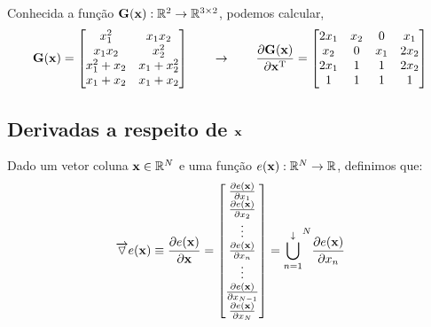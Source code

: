 \begin{example}
Conhecida a função $\MATRIX{G}(\VECTOR{x}): \mathbb{R}^2 \rightarrow \mathbb{R}^{3 \times 2}$, podemos calcular,
\begin{equation}
\MATRIX{G}(\VECTOR{x})=
\begin{bmatrix}
x_1^2       & x_1 x_2\\
x_1 x_2     & x_2^2\\
x_1^2 + x_2 & x_1 + x_2^2\\
x_1 + x_2   & x_1 + x_2
\end{bmatrix}
\qquad \rightarrow \qquad
\frac{\partial \MATRIX{G}(\VECTOR{x}) }{\partial \VECTOR{x}^{\transpose}}= 
\begin{bmatrix}
2 x_1 & x_2 & 0   &   x_1\\
  x_2 & 0   & x_1 & 2 x_2\\
2 x_1 & 1   & 1   & 2 x_2\\
    1 & 1   & 1   & 1
\end{bmatrix}
\end{equation}
\end{example}
\subsection{Derivadas a respeito de $\VECTOR{x}$}

\begin{definition}\label{def:deltaver}
Dado 
um vetor coluna $\VECTOR{x}\in \mathbb{R}^N$ e 
uma função $e(\VECTOR{x}): \mathbb{R}^N \rightarrow \mathbb{R}$,
definimos que:
\begin{equation}
\overrightarrow{\triangledown} e(\VECTOR{x}) \equiv 
\frac{\partial e(\VECTOR{x}) }{\partial \VECTOR{x}}= 
\left[
\begin{matrix}
\frac{\partial e(\VECTOR{x}) }{\partial x_{1}} \\
\frac{\partial e(\VECTOR{x}) }{\partial x_{2}} \\
\vdots \\
\frac{\partial e(\VECTOR{x}) }{\partial x_{n}} \\
\vdots \\
\frac{\partial e(\VECTOR{x}) }{\partial x_{N-1}} \\
\frac{\partial e(\VECTOR{x}) }{\partial x_{N}} 
\end{matrix}
\right] = 
{\bigcup\limits_{n=1}^{\downarrow}}^{N}{\frac{\partial e(\VECTOR{x}) }{\partial x_{n}}} 
\end{equation}
\end{definition}

